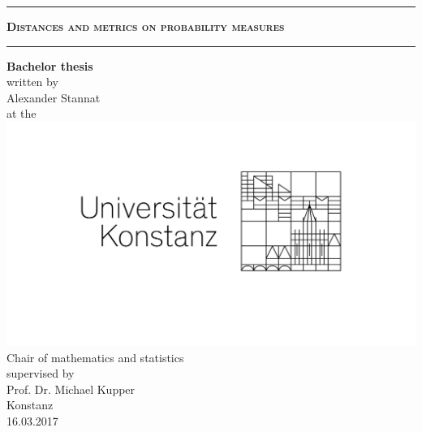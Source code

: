 \documentclass[11pt,a4paper]{article}
\begin{document}
\bigskip\noindent
\hrule\vspace{1em}
\begin{center}{\bf{\Large \textsc{Distances and metrics on probability measures}}}\end{center}\vspace{1em}
\hrule
\bigskip\bigskip\bigskip\noindent 
\begin{center}
{\bf Bachelor thesis} \vspace{1em}\\ written by \vspace{1em}\\ Alexander Stannat \\ \bigskip at the \vspace{3em}\\ \includegraphics[scale=1.3]{Bild.png}  \\
\bigskip\bigskip Chair of mathematics and statistics \\ \bigskip supervised by \vspace{1em}\\ Prof. Dr. Michael Kupper \vspace{2em}\\ Konstanz \\ 16.03.2017
\end{center}

\newpage

\setcounter{tocdepth}{2}
\tableofcontents
\newpage
{}
\end{document}
